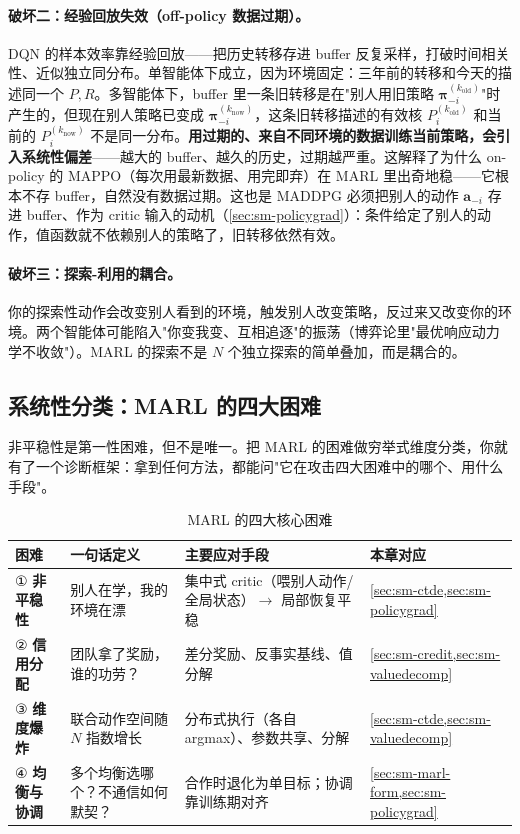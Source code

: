 \paragraph{破坏二：经验回放失效（off-policy 数据过期）。}
DQN 的样本效率靠经验回放——把历史转移存进 buffer 反复采样，打破时间相关性、近似独立同分布。单智能体下成立，因为环境固定：三年前的转移和今天的描述同一个 $P,R$。多智能体下，buffer 里一条旧转移是在"别人用旧策略 $\boldsymbol{\pi}_{-i}^{(k_{\text{old}})}$"时产生的，但现在别人策略已变成 $\boldsymbol{\pi}_{-i}^{(k_{\text{now}})}$，这条旧转移描述的有效核 $P_i^{(k_{\text{old}})}$ 和当前的 $P_i^{(k_{\text{now}})}$ 不是同一分布。\textbf{用过期的、来自不同环境的数据训练当前策略，会引入系统性偏差}——越大的 buffer、越久的历史，过期越严重。这解释了为什么 on-policy 的 MAPPO（每次用最新数据、用完即弃）在 MARL 里出奇地稳——它根本不存 buffer，自然没有数据过期。这也是 MADDPG 必须把别人的动作 $\mathbf{a}_{-i}$ 存进 buffer、作为 critic 输入的动机（\cref{sec:sm-policygrad}）：条件给定了别人的动作，值函数就不依赖别人的策略了，旧转移依然有效。

\paragraph{破坏三：探索-利用的耦合。}
你的探索性动作会改变别人看到的环境，触发别人改变策略，反过来又改变你的环境。两个智能体可能陷入"你变我变、互相追逐"的振荡（博弈论里"最优响应动力学不收敛"）。MARL 的探索不是 $N$ 个独立探索的简单叠加，而是耦合的。

\subsection{系统性分类：MARL 的四大困难}
\label{sec:sm-four-difficulties}

非平稳性是第一性困难，但不是唯一。把 MARL 的困难做穷举式维度分类，你就有了一个诊断框架：拿到任何方法，都能问"它在攻击四大困难中的哪个、用什么手段"。

\begin{table}[H]\centering\small
\caption{MARL 的四大核心困难}
\label{tab:sm-four-diff}
\begin{tabular}{p{} p{} p{} p{}}
\toprule
困难 & 一句话定义 & 主要应对手段 & 本章对应 \\
\midrule
① \textbf{非平稳性} & 别人在学，我的环境在漂 & 集中式 critic（喂别人动作/全局状态）$\to$ 局部恢复平稳 & \cref{sec:sm-ctde,sec:sm-policygrad} \\
② \textbf{信用分配} & 团队拿了奖励，谁的功劳？ & 差分奖励、反事实基线、值分解 & \cref{sec:sm-credit,sec:sm-valuedecomp} \\
③ \textbf{维度爆炸} & 联合动作空间随 $N$ 指数增长 & 分布式执行（各自 argmax）、参数共享、分解 & \cref{sec:sm-ctde,sec:sm-valuedecomp} \\
④ \textbf{均衡与协调} & 多个均衡选哪个？不通信如何默契？ & 合作时退化为单目标；协调靠训练期对齐 & \cref{sec:sm-marl-form,sec:sm-policygrad} \\
\bottomrule
\end{tabular}
\end{table}

